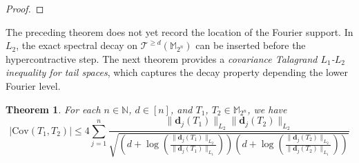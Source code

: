\documentclass{amsbook}
\newtheorem{theorem}{Theorem}[chapter]
\theoremstyle{definition}
\theoremstyle{remark}
\numberwithin{section}{chapter}
\numberwithin{equation}{chapter}
\newcommand{\M}{\mathbb{M}}
\newcommand{\1}{\mathbf{1}}
\newcommand{\dc}{\mathbf{d}}
\begin{document}
\begin{proof}
\end{proof}

The preceding theorem does not yet record the location of the Fourier support.
In $L_{2}$, the exact spectral decay on $\mathcal{T}^{\geq d}(\M_{2^{n}})$ can be inserted
before the hypercontractive step. The next theorem provides a \emph{covariance Talagrand $L_{1}$-$L_{2}$ inequality for tail spaces}, which captures the decay property depending the lower Fourier level.

\begin{theorem}\label{cov-tala-d-tail-l2}
For each $n\in \mathbb{N}$, $d\in [n]$, and $T_{1}$, $T_{2}\in \mathbb{M}_{2^{n}}$, we have
\begin{equation}\label{cov-tail-l2-estimate}
\big|\mathrm{Cov}(T_{1},T_{2})\big|\leq4\sum_{j=1}^{n}
\frac{\|\dc_{j}(T_{1})\|_{L_{2}}\|\dc_{j}(T_{2})\|_{L_{2}}} {\sqrt{\left(d+\log\left(\frac{\|\dc_{j}(T_{1})\|_{L_{2}}}{\|\dc_{j}(T_{1})\|_{L_{1}}}\right)\right)\left(d+\log\left(\frac{\|\dc_{j}(T_{2})\|_{L_{2}}}{\|\dc_{j}(T_{2})\|_{L_{1}}}\right)\right)}}
\end{equation}
\end{theorem}
\end{document}
